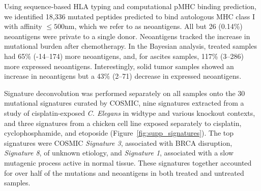 




Using sequence-based HLA typing and computational pMHC binding prediction, we identified 18,336 mutated peptides predicted to bind autologous MHC class I with affinity $\leq 500$nm, which we refer to as neoantigens. All but 26 (0.14\%) neoantigens were private to a single donor. Neoantigens tracked the increase in mutational burden after chemotherapy. In the Bayesian analysis, treated samples had 65\% (-14--174) more neoantigens, and, for ascites samples, 117\% (3--286) more expressed neoantigens. Interestingly, solid tumor samples showed an increase in neoantigens but a 43\% (2--71) decrease in expressed neoantigens.

Signature deconvolution was performed separately on all samples onto the 30 mutational signatures curated by COSMIC\cite{364242}, nine signatures extracted from a study of cisplatin-exposed \textit{C. Elegans}\cite{Meier_2014} in widtype and various knockout contexts, and three signatures from a chicken cell line exposed separately to cisplatin, cyclophosphamide, and etoposide\cite{Szikriszt_2016} (Figure~\ref{fig:supp_signatures}). The top signatures were COSMIC \textit{Signature 3}, associated with BRCA disruption, \textit{Signature 8}, of unknown etiology, and \textit{Signature 1}, associated with a slow mutagenic process active in normal tissue. These signatures together accounted for over half of the mutations and neoantigens in both treated and untreated samples.

